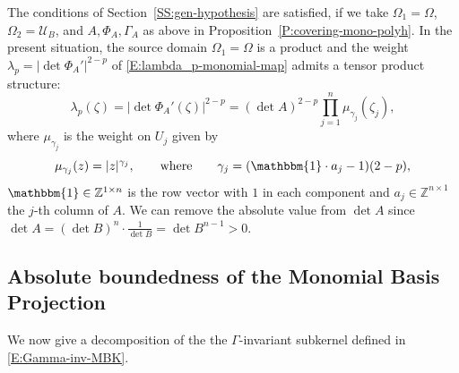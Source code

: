 \documentclass[letterpaper,11pt,reqno]{amsart}
\theoremstyle{plain}
\theoremstyle{definition}
\theoremstyle{remark}
\theoremstyle{remark}
\numberwithin{equation}{section}
\newcommand{\one}{\mathbbm{1}}
\newcommand{\abs}[1]{\left\vert#1\right\vert}
\newcommand{\mugj}{{\mu_{\gamma_j}}}
\newcommand{\Z}{{\mathbb Z}}
\newcommand{\Uu}{\mathscr{U}}
\begin{document}
The conditions of Section~\ref{SS:gen-hypothesis} are satisfied, if we take  $\Omega_1=\Omega$, $\Omega_2=\Uu_B$, and $A, \Phi_A, \Gamma_A$ as above in Proposition~\ref{P:covering-mono-polyh}.  
In the present situation, the source domain $\Omega_1=\Omega$ is a product and the weight $\lambda_p=\abs{\det\Phi_A'}^{2-p}$ of \eqref{E:lambda_p-monomial-map} admits a tensor product structure:
\begin{equation}\label{eq-lambdap-monopoly}
\lambda_p(\zeta) = \abs{\det \Phi_A'(\zeta)}^{2-p} = (\det A)^{2-p} \prod_{j=1}^n \mugj(\zeta_j),
\end{equation}
where $\mugj$ is the weight on $U_j$ given by
\begin{equation}\label{E:component-weights}
\mugj(z) = |z|^{\gamma_j}, \qquad \mathrm{where} \qquad \gamma_j = (\one \cdot a_j -1)(2-p),
\end{equation}
$\one \in \Z^{1 \times n}$ is the row vector with $1$ in each component and $a_j \in \Z^{n \times 1}$ the $j$-th column of $A$.
We can remove the absolute value from $\det A$ since $\det A = (\det B)^n\cdot \frac{1}{\det B} = \det B^{n-1}>0$.

\subsection{Absolute boundedness of the Monomial Basis Projection}\label{SS:Lp-bddness-AMBO}
We now give a decomposition of the the $\Gamma$-invariant subkernel defined in \eqref{E:Gamma-inv-MBK}. 
\end{document}
